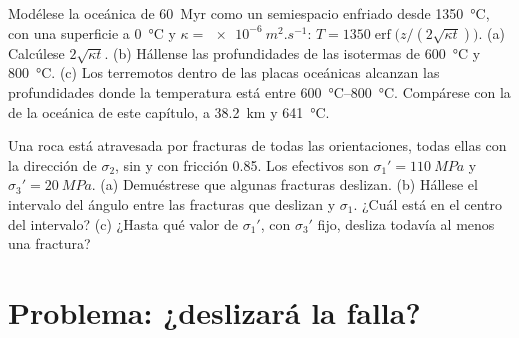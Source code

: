 \begin{exercise}[$\star\star\star$]\label{exo:b1:stress-strain-rheology:11}
Modélese la  oceánica de \qty{60}{Myr} como un semiespacio enfriado desde \qty{1350}{\degreeCelsius}, con una
superficie a \qty{0}{\degreeCelsius} y $\kappa = \qty{e-6}{m^2.s^{-1}}$: $T = \num{1350}\operatorname{erf}\bigl(z/(2\sqrt{\kappa t})\bigr)$.
(a) Calcúlese $2\sqrt{\kappa t}$. (b) Hállense las profundidades de las isotermas de \qty{600}{\degreeCelsius} y
\qty{800}{\degreeCelsius}. (c) Los terremotos dentro de las placas oceánicas alcanzan las profundidades donde la temperatura
está entre \qtyrange{600}{800}{\degreeCelsius}. Compárese con la  de la 
oceánica de este capítulo, a \qty{38.2}{km} y \qty{641}{\degreeCelsius}.
\end{exercise}

\begin{exercise}[$\star\star\star$]\label{exo:b1:stress-strain-rheology:12}
Una roca está atravesada por fracturas de todas las orientaciones, todas ellas con la dirección de $\sigma_2$, sin 
y con fricción 0.85. Los  efectivos son $\sigma_1' = \qty{110}{MPa}$ y $\sigma_3' = \qty{20}{MPa}$.
(a) Demuéstrese que algunas fracturas deslizan. (b) Hállese el intervalo del ángulo entre las fracturas que deslizan y
$\sigma_1$. ¿Cuál está en el centro del intervalo? (c) ¿Hasta qué valor de $\sigma_1'$, con $\sigma_3'$ fijo, desliza
todavía al menos una fractura?
\end{exercise}

\section{Problema: ¿deslizará la falla?}

